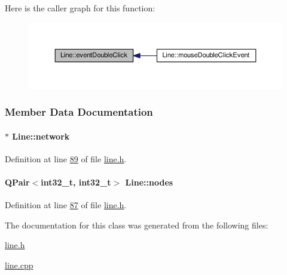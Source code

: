 Here is the caller graph for this function\+:\nopagebreak
\begin{figure}[H]
\begin{center}
\leavevmode
\includegraphics[width=350pt]{class_line_a2444b577ea2254994599c6f829c629a5_icgraph}
\end{center}
\end{figure}




\subsubsection{Member Data Documentation}
\hypertarget{class_line_aefdf6a6c3e3775b5a16b344c1d33964e}{}
\paragraph[{network}]{$\ast$ Line\+::network}\label{class_line_aefdf6a6c3e3775b5a16b344c1d33964e}


Definition at line \hyperlink{line_8h_source_l00089}{89} of file \hyperlink{line_8h_source}{line.\+h}.

\hypertarget{class_line_afd17c40d656e6a8d677cb22df5f0c70b}{}
\paragraph[{nodes}]{\setlength{\rightskip}{0pt plus 5cm}Q\+Pair$<$int32\+\_\+t, int32\+\_\+t$>$ Line\+::nodes}\label{class_line_afd17c40d656e6a8d677cb22df5f0c70b}


Definition at line \hyperlink{line_8h_source_l00087}{87} of file \hyperlink{line_8h_source}{line.\+h}.



The documentation for this class was generated from the following files\+:\begin{DoxyCompactItemize}
\item 
\hyperlink{line_8h}{line.\+h}\item 
\hyperlink{line_8cpp}{line.\+cpp}\end{DoxyCompactItemize}
